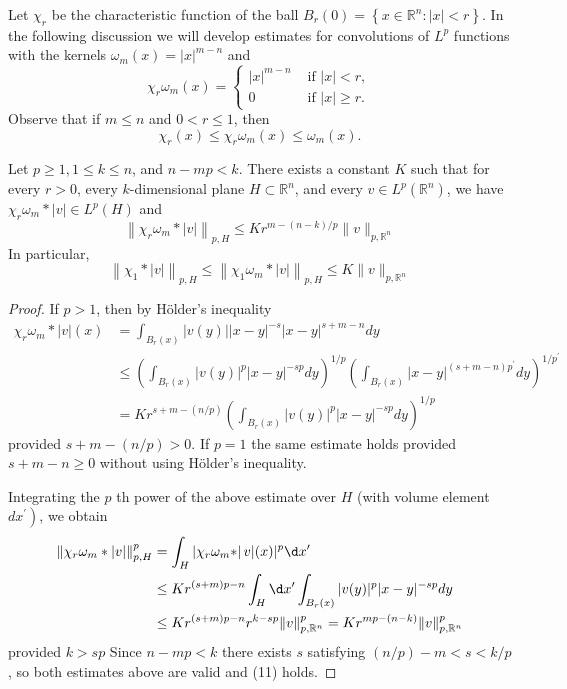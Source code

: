Let $\chi_r$ be the characteristic function of the ball $B_r(0)=\left\{x \in \mathbb{R}^n:|x|<r\right\}$.
In the following discussion we will develop estimates for convolutions of $L^p$ functions with the kernels 
$\omega_m(x)=|x|^{m-n}$ and
\[
\chi_r \omega_m(x)= \begin{cases}|x|^{m-n} & \text { if }|x|<r, \\ 0 & \text { if }|x| \geq r .\end{cases}
\]
Observe that if $m \leq n$ and $0<r \leq 1$, then
\[
\chi_r(x) \leq \chi_r \omega_m(x) \leq \omega_m(x).
\]


\begin{lemma}
  Let $p \geq 1,1 \leq k \leq n$, and $n-m p<k$. There exists a constant $K$ such that for every $r>0$,
  every $k$-dimensional plane $H \subset \mathbb{R}^n$, and every $v \in L^p\left(\mathbb{R}^n\right)$,
  we have $\chi_r \omega_m *|v| \in L^p(H)$ and
  \[
  \left\|\chi_r \omega_m *|v|\right\|_{p, H} \leq K r^{m-(n-k) / p}\|v\|_{p, \mathbb{R}^n}
  \]
  In particular,
  \[
  \left\|\chi_1 *|v|\right\|_{p, H} \leq\left\|\chi_1 \omega_m *|v|\right\|_{p, H} \leq K\|v\|_{p, \mathbb{R}^n}
  \]
\end{lemma}

\begin{proof}
  If $p>1$, then by Hölder's inequality
  \[
  \begin{aligned}
  \chi_r \omega_m *|v|(x) & =\int_{B_r(x)}|v(y)||x-y|^{-s}|x-y|^{s+m-n} d y \\
  & \leq\left(\int_{B_r(x)}|v(y)|^p|x-y|^{-s p} d y\right)^{1 / p}\left(\int_{B_r(x)}|x-y|^{(s+m-n) p^{\prime}} d y\right)^{1 / p^{\prime}} \\
  & =K r^{s+m-(n / p)}\left(\int_{B_r(x)}|v(y)|^p|x-y|^{-s p} d y\right)^{1 / p}
  \end{aligned}
  \]
  provided $s+m-(n / p)>0$. If $p=1$ the same estimate holds provided $s+m-n \geq 0$
  without using Hölder's inequality.
  
  Integrating the $p$ th power of the above estimate over $H$ (with volume element $\left.d x^{\prime}\right)$, we obtain
  \[
  \begin{aligned}
  \left\|\chi_r \omega_m *|v|\right\|_{p, H}^p & =\int_H\left|\chi_r \omega_m *\right| v|(x)|^p \d x^{\prime} \\
  & \leq K r^{(s+m) p-n} \int_H \d x^{\prime} \int_{B_r(x)}|v(y)|^p|x-y|^{-s p} d y \\
  & \leq K r^{(s+m) p-n} r^{k-s p}\|v\|_{p, \mathbb{R}^n}^p=K r^{m p-(n-k)}\|v\|_{p, \mathbb{R}^n}^p
  \end{aligned}
  \]
  provided $k>s p$
  Since $n-m p<k$ there exists $s$ satisfying $(n / p)-m<s<k / p$, so both estimates above are valid and (11) holds.
\end{proof}



